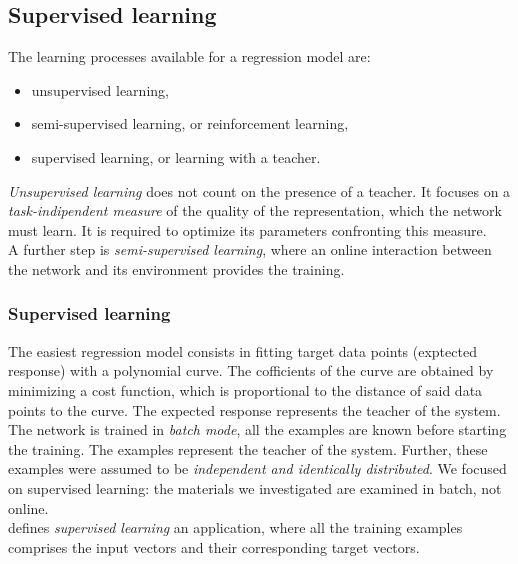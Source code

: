\subsection{Supervised learning}
\label{subsec:supervisedlearning}

The learning processes available for a regression model are:

\begin{itemize}
  \item{unsupervised learning,}
  \item{semi-supervised learning, or reinforcement learning,}  
  \item{supervised learning, or learning with a teacher.}
\end{itemize}

\textit{Unsupervised learning} does not count on the presence of a teacher.
It focuses on a \textit{task-indipendent measure} of the quality of the
representation, which the network must learn. It is required to optimize its
parameters confronting this measure.\\
A further step is \textit{semi-supervised learning}, where an online interaction
between the network and its environment provides the training.

\subsubsection{Supervised learning}
\label{subsubsec:supervisedlearning}

The easiest regression model consists in fitting target data
points (exptected response) with a polynomial curve.
The cofficients of the curve are obtained by minimizing a cost function, which
is proportional to the distance of said data points to the curve.
The expected response represents the teacher of the system.
The network is trained in \textit{batch mode}, all the examples are known before
starting the training.
The examples represent the teacher of the system.
Further, these examples were assumed to be \textit{independent and identically
distributed}.
We focused on supervised learning: the materials we investigated
are examined in batch, not online.\\
\citet{RefWorks:194} defines \textit{supervised learning} an application, where all the
training examples comprises the input vectors and their corresponding target
vectors.


